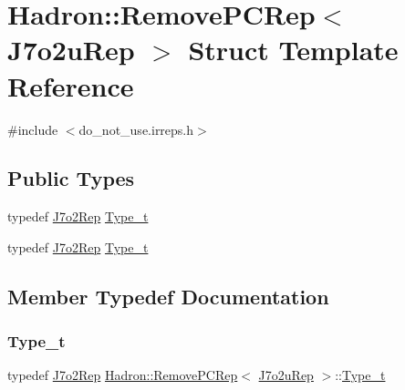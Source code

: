 \hypertarget{structHadron_1_1RemovePCRep_3_01J7o2uRep_01_4}{}\section{Hadron\+:\+:Remove\+P\+C\+Rep$<$ J7o2u\+Rep $>$ Struct Template Reference}
\label{structHadron_1_1RemovePCRep_3_01J7o2uRep_01_4}


{\ttfamily \#include $<$do\+\_\+not\+\_\+use.\+irreps.\+h$>$}

\subsection*{Public Types}
\begin{DoxyCompactItemize}
\item 
typedef \mbox{\hyperlink{structHadron_1_1J7o2Rep}{J7o2\+Rep}} \mbox{\hyperlink{structHadron_1_1RemovePCRep_3_01J7o2uRep_01_4_a41f9fc887bdc034a1a02ac22a5521c00}{Type\+\_\+t}}
\item 
typedef \mbox{\hyperlink{structHadron_1_1J7o2Rep}{J7o2\+Rep}} \mbox{\hyperlink{structHadron_1_1RemovePCRep_3_01J7o2uRep_01_4_a41f9fc887bdc034a1a02ac22a5521c00}{Type\+\_\+t}}
\end{DoxyCompactItemize}


\subsection{Member Typedef Documentation}
\mbox{\label{structHadron_1_1RemovePCRep_3_01J7o2uRep_01_4_a41f9fc887bdc034a1a02ac22a5521c00}} 
\subsubsection{\texorpdfstring{Type\_t}{Type\_t}\hspace{0.1cm}{\footnotesize\ttfamily [1/2]}}
{\footnotesize\ttfamily typedef \mbox{\hyperlink{structHadron_1_1J7o2Rep}{J7o2\+Rep}} \mbox{\hyperlink{structHadron_1_1RemovePCRep}{Hadron\+::\+Remove\+P\+C\+Rep}}$<$ \mbox{\hyperlink{structHadron_1_1J7o2uRep}{J7o2u\+Rep}} $>$\+::\mbox{\hyperlink{structHadron_1_1RemovePCRep_3_01J7o2uRep_01_4_a41f9fc887bdc034a1a02ac22a5521c00}{Type\+\_\+t}}}

